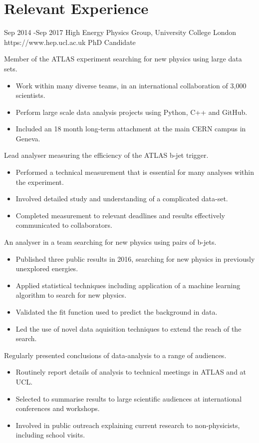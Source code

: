 \documentclass[10pt]{article} %
\begin{document}
\section{Relevant Experience}
\job
{Sep 2014 -}{Sep 2017}
{High Energy Physics Group, University College London}
{https://www.hep.ucl.ac.uk}
{PhD Candidate}
{
  \begin{itemize-noindent}
  \item{Member of the ATLAS experiment searching for new physics using large data sets.}
    \begin{itemize}
    \item{Work within many diverse teams, in an international collaboration of 3,000 scientists.}
    \item{Perform large scale data analysis projects using Python, C++ and GitHub.}
    \item{Included an 18 month long-term attachment at the main CERN campus in Geneva.} 
    \end{itemize}
  \item{Lead analyser measuring the efficiency of the ATLAS b-jet trigger.}
    \begin{itemize}
    \item{Performed a technical measurement that is essential for many analyses within the experiment.}
    \item{Involved detailed study and understanding of a complicated data-set.}
    \item{Completed measurement to relevant deadlines and results effectively communicated to collaborators.}
    \end{itemize}
  \item{ An analyser in a team searching for new physics using pairs of b-jets.}
    \begin{itemize}
    \item{Published three public results in 2016, searching for new physics in previously unexplored energies.}
    \item{Applied statistical techniques including application of a machine learning algorithm to search for new physics.}
    \item{Validated the fit function used to predict the background in data.}
    \item{Led the use of novel data aquisition techniques to extend the reach of the search.}
    \end{itemize}
 \item{Regularly presented conclusions of data-analysis to a range of audiences.}
   \begin{itemize}
   \item{Routinely report details of analysis to technical meetings in ATLAS and at UCL.}
   \item{Selected to summarise results to large scientific audiences at international conferences and workshops.}
   \item{Involved in public outreach explaining current research to non-physicists, including school visits.}
   \end{itemize}
 \end{itemize-noindent}
}
\end{document}
